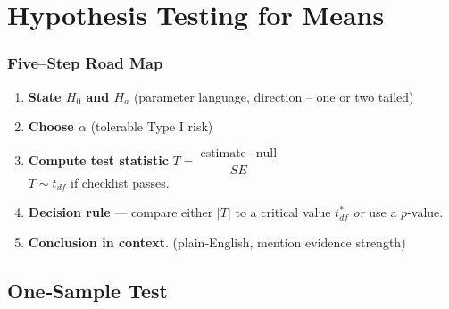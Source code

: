 \documentclass[handout]{beamer}
\begin{document}
\section{Hypothesis Testing for Means}




\begin{frame}
\frametitle{Five–Step Road Map}
\begin{enumerate}
  \item \textbf{State \(H_0\) and \(H_a\)}   (parameter language, direction -- one or two tailed)\\[0.2em]
  \item \textbf{Choose \(\alpha\)}           (tolerable Type I risk)\\[0.2em]
  \item \textbf{Compute test statistic}     \(T=\dfrac{\text{estimate}-\text{null}}{SE}\)\\[0.3em]
        \(T\sim t_{df}\) if checklist passes.\\[0.2em]
  \item \textbf{Decision rule}  — compare either \(|T|\) to a critical value \(t^{\ast}_{df}\) \emph{or} use a \(p\)-value.\\[0.2em]
  \item \textbf{Conclusion in context}.     (plain‑English, mention evidence strength)
\end{enumerate}
\end{frame}

\subsection{One‑Sample Test}
\end{document}
